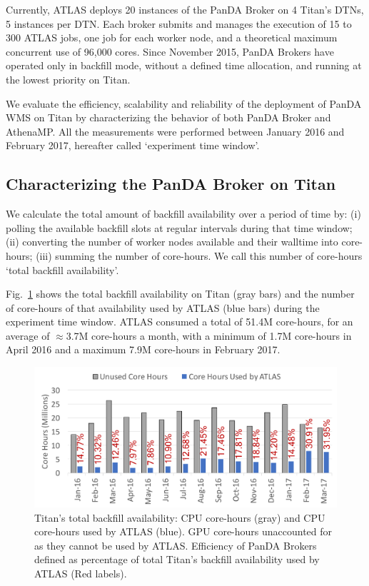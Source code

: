 Currently, ATLAS deploys 20 instances of the PanDA Broker on 4 Titan's DTNs, 5
instances per DTN. Each broker submits and manages the execution of 15 to 300
ATLAS jobs, one job for each worker node, and a theoretical maximum concurrent
use of 96,000 cores. Since November 2015, PanDA Brokers have operated only in
backfill mode, without a defined time allocation, and running at the lowest
priority on Titan.

We evaluate the efficiency, scalability and reliability of the deployment of
PanDA WMS on Titan by characterizing the behavior of both PanDA Broker and
AthenaMP. All the measurements were performed between January 2016 and February
2017, hereafter called `experiment time window'.

\subsection{Characterizing the PanDA Broker on Titan}
\label{ssec:broker_titan}

We calculate the total amount of backfill availability over a period of time by:
(i) polling the available backfill slots at regular intervals during that time
window; (ii) converting the number of worker nodes available and their walltime
into core-hours; (iii) summing the number of core-hours. We call this number of
core-hours `total backfill availability'.

Fig.~\ref{fig:backfill-utilization} shows the total backfill availability on
Titan (gray bars) and the number of core-hours of that availability used by
ATLAS (blue bars) during the experiment time window. ATLAS consumed a total of
51.4M core-hours, for an average of $\approx$3.7M core-hours a month, with a
minimum of 1.7M core-hours in April 2016 and a maximum 7.9M core-hours in
February 2017.

\begin{figure}[htp]
    \includegraphics[clip,width=\columnwidth]{figures/backfill_consumption.pdf}
    \caption{Titan's total backfill availability: CPU core-hours (gray) and CPU
    core-hours used by ATLAS (blue). GPU core-hours unaccounted for as they
    cannot be used by ATLAS. Efficiency of PanDA Brokers defined as percentage
    of total Titan's backfill availability used by ATLAS (Red labels).}
\label{fig:backfill-utilization}
\end{figure}

